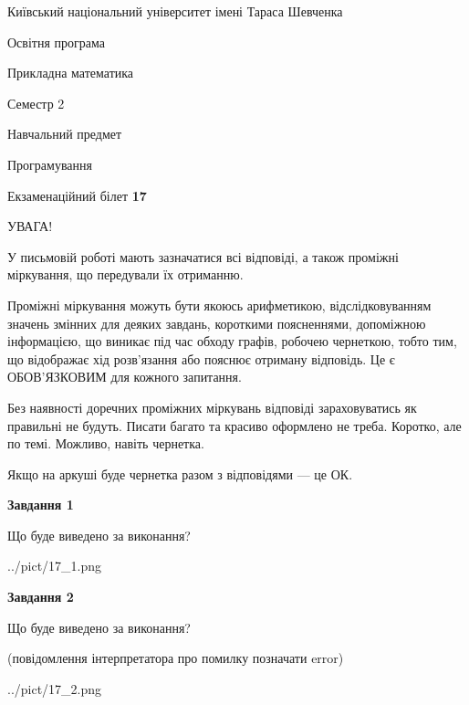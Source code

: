 \documentclass[12pt, ukrainian]{article}
\begin{document}
{{\begin {small}\par
{ \center  Київський національний університет імені Тараса Шевченка \par}
{\parbox {5 cm}{Освітня програма \hfill}{\parbox {7 cm}{Прикладна математика\hfill}}\parbox {6 cm}{\hfill Семестр 2}}\par
{\parbox {5 cm} {Навчальний предмет \hfill}\parbox {7 cm}{Програмування \hfill}\parbox {6cm}{\hfill}\par}\vspace{-7pt} \end{small}}{\center Екзаменаційний білет \No \textbf
{ 17 }\par}}
{
\begin {large}
УВАГА!

У письмовій роботі мають зазначатися всі відповіді, а також проміжні міркування, що передували їх отриманню.

Проміжні міркування можуть бути якоюсь арифметикою, відслідковуванням зна\-чень змінних для деяких завдань,
короткими поясненнями, допоміжною інформацією, що виникає під час обходу графів, робочею чернеткою,
тобто тим, що відображає хід розв’язання або пояснює отриману відповідь.
Це є ОБОВ’ЯЗКОВИМ для кожного запитання.

Без наявності доречних проміжних міркувань відповіді зараховуватись як правиль\-ні не будуть.
Писати багато та красиво оформлено не треба. Коротко, але по темі. Можли\-во, навіть чернетка.

Якщо на аркуші буде чернетка разом з відповідями --- це ОК.

\newpage

{\begin {center}\textbf{Завдання 1}\end {center}}\par
Що буде виведено за виконання?\par
\begin{center}
	{../pict/17_1.png}
\end{center}
\newpage

{\begin {center}\textbf{Завдання 2}\end {center}}\par
Що буде виведено за виконання?\par
 (повідомлення інтерпретатора про помилку позначати error)\par
\begin{center}
	{../pict/17_2.png}
\end{center}
\newpage


\end{large}}
\end{document}

